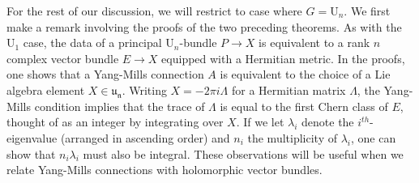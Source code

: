 %
For the rest of our discussion, we will restrict to case where
$G = \mathrm{U}_n$. We first make a remark involving the proofs of the
two preceding theorems. As with the $\mathrm{U}_1$ case, the data of
a principal $\mathrm{U}_n$-bundle $P \to X$ is equivalent to a
rank $n$ complex vector bundle $E \to X$ equipped with a Hermitian metric.
In the proofs, one shows that a Yang-Mills connection $A$ is equivalent to the
choice of a Lie algebra element $X \in \mathfrak{u_n}$. Writing
$X = -2\pi i \Lambda$ for a Hermitian matrix $\Lambda$, the Yang-Mills
condition implies that the trace of $\Lambda$ is equal to the first Chern
class of $E$, thought of as an integer by integrating over $X$. If
we let $\lambda_i$ denote the $i^{th}$-eigenvalue (arranged in ascending order)
and $n_i$ the multiplicity of $\lambda_i$, one can show that $n_i\lambda_i$ must
also be integral. These observations will be useful when we relate
Yang-Mills connections with holomorphic vector bundles.
%